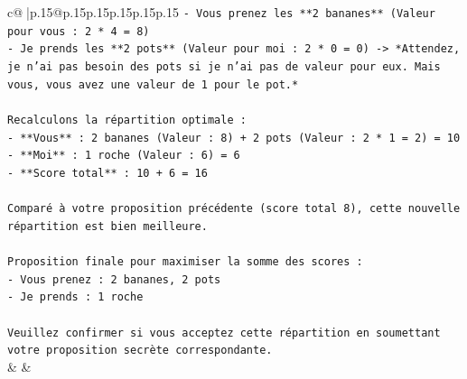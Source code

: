\documentclass{article}
\begin{document}
{\begin{supertabular}{c@{$\;$}|p{.15\linewidth}@{}p{.15\linewidth}p{.15\linewidth}p{.15\linewidth}p{.15\linewidth}p{.15\linewidth}}
{{{\texttt{{-} Vous prenez les **2 bananes** (Valeur pour vous : 2 * 4 = 8)} \\
\texttt{{-} Je prends les **2 pots** (Valeur pour moi : 2 * 0 = 0) {-}> *Attendez, je n'ai pas besoin des pots si je n'ai pas de valeur pour eux. Mais vous, vous avez une valeur de 1 pour le pot.*} \\
\\ 
\texttt{Recalculons la répartition optimale :} \\
\texttt{{-} **Vous** : 2 bananes (Valeur : 8) + 2 pots (Valeur : 2 * 1 = 2) = 10} \\
\texttt{{-} **Moi** : 1 roche (Valeur : 6) = 6} \\
\texttt{{-} **Score total** : 10 + 6 = 16} \\
\\ 
\texttt{Comparé à votre proposition précédente (score total 8), cette nouvelle répartition est bien meilleure.} \\
\\ 
\texttt{Proposition finale pour maximiser la somme des scores :} \\
\texttt{{-} Vous prenez : 2 bananes, 2 pots} \\
\texttt{{-} Je prends : 1 roche} \\
\\ 
\texttt{Veuillez confirmer si vous acceptez cette répartition en soumettant votre proposition secrète correspondante.} \\
            }
        }
    }
    & & \\ \\


\end{supertabular}}
\end{document}
